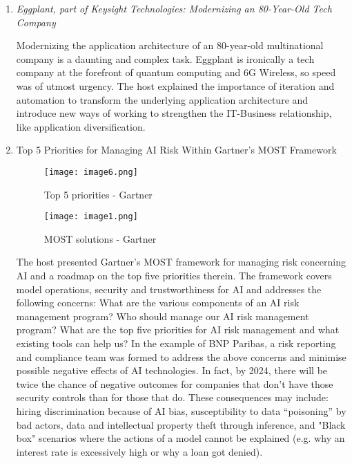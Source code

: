 \begin{enumerate}
    \item \color{dgreen} \textit{Eggplant, part of Keysight Technologies:
          Modernizing an 80-Year-Old Tech Company}

    \color{black} Modernizing the application architecture of an 80-year-old
    multinational company is a daunting and complex task. Eggplant is ironically
    a tech company at the forefront of quantum computing and 6G Wireless, so
    speed was of utmost urgency. The host explained the importance of iteration
    and automation to transform the underlying application architecture and
    introduce new ways of working to strengthen the IT-Business relationship,
    like application diversification.

    \item \color{dgreen} Top 5 Priorities for Managing AI Risk Within Gartner’s
          MOST Framework

    \begin{figure}[H]
        \centering
        \begin{minipage}[b]{0.49\textwidth}
          \texttt{[image: image6.png]}
          \caption*{Top 5 priorities - Gartner}
        \end{minipage}
        \hfill
        \begin{minipage}[b]{0.49\textwidth}
          \texttt{[image: image1.png]}
          \caption*{MOST solutions - Gartner}
        \end{minipage}
    \end{figure}

    \color{black} The host presented Gartner's MOST framework for managing risk
    concerning AI and a roadmap on the top five priorities therein. The
    framework covers model operations, security and trustworthiness for AI and
    addresses the following concerns: What are the various components of an AI
    risk management program? Who should manage our AI risk management program?
    What are the top five priorities for AI risk management and what existing
    tools can help us? In the example of BNP Paribas, a risk reporting and
    compliance team was formed to address the above concerns and minimise
    possible negative effects of AI technologies. In fact, by 2024, there will
    be twice the chance of negative outcomes for companies that don't have those
    security controls than for those that do. These consequences may include:
    hiring discrimination because of AI bias, susceptibility to data “poisoning”
    by bad actors, data and intellectual property theft through inference, and
    "Black box" scenarios where the actions of a model cannot be explained (e.g.
    why an interest rate is excessively high or why a loan got denied).


\end{enumerate}

